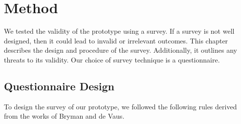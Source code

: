 \section{Method}
\label{section:survey_method}

We tested the validity of the prototype using a survey.
If a survey is not well designed, then it could lead to invalid or irrelevant outcomes.
This chapter describes the design and procedure of the survey.
Additionally, it outlines any threats to its validity.
Our choice of survey technique is a questionnaire.

\subsection{Questionnaire Design}
To design the survey of our prototype, we followed the following rules derived from the works of Bryman\cite{bryman2016social} and de Vaus\cite{de2013surveys}.


